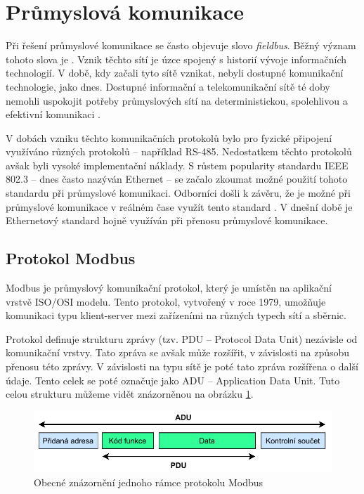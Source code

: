 \section{Průmyslová komunikace}\label{sec:fieldbus}

Při řešení průmyslové komunikace se často objevuje slovo \textit{fieldbus}. Běžný význam tohoto slova je  \cite{fieldbus_thomesse}. Vznik těchto sítí je úzce spojený s historií vývoje informačních technologií. V době, kdy začali tyto sítě vznikat, nebyli dostupné komunikační technologie, jako dnes. Dostupné informační a telekomunikační sítě té doby nemohli uspokojit potřeby průmyslových sítí na deterministickou, spolehlivou a efektivní komunikaci \cite{future_of_ind_com}. 

V dobách vzniku těchto komunikačních protokolů bylo pro fyzické připojení využíváno různých protokolů -- například RS-485. Nedostatkem těchto protokolů avšak byli vysoké implementační náklady. S růstem popularity standardu IEEE 802.3 -- dnes často nazýván Ethernet -- se začalo zkoumat možné použití tohoto standardu při průmyslové komunikaci. Odborníci došli k závěru, že je možné při průmyslové komunikace v reálném čase využít tento standard \cite{lee_ethernet_fieldbus}. V dnešní době je Ethernetový standard hojně využíván při přenosu průmyslové komunikace.


\subsection{Protokol Modbus}
Modbus je průmyslový komunikační protokol, který je umístěn na aplikační vrstvě ISO/OSI modelu. Tento protokol, vytvořený v roce 1979, umožňuje komunikaci typu klient-server mezi zařízeními na různých typech sítí a sběrnic. 

Protokol definuje strukturu zprávy (tzv. PDU -- Protocol Data Unit) nezávisle od komunikační vrstvy. Tato zpráva se avšak může rozšířit, v závislosti na způsobu přenosu této zprávy. V závislosti na typu sítě je poté tato zpráva rozšířena o další údaje. Tento celek se poté označuje jako ADU -- Application Data Unit. Tuto celou strukturu můžeme vidět znázorněnou na obrázku \ref{fig:modbus_frame}.~\cite{modbus}

\begin{figure}[htbp]
    \centering 
    \includegraphics[width=\textwidth]{assets/img/modbusframe.pdf}
    \caption{Obecné znázornění jednoho rámce protokolu Modbus}
    \label{fig:modbus_frame}
\end{figure}

